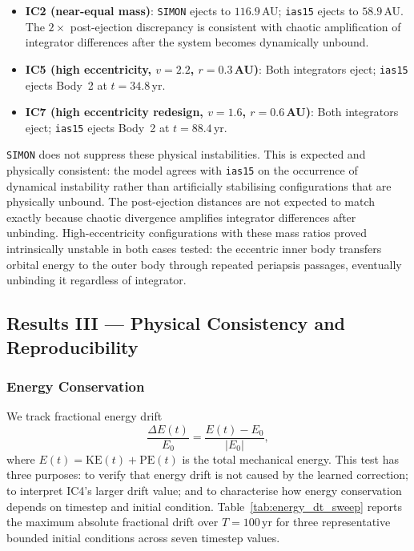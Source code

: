 \documentclass[12pt]{article}
\begin{document}
\begin{itemize}
  \item \textbf{IC2 (near-equal mass)}: \texttt{SIMON} ejects to $116.9$\,AU;
        \texttt{ias15} ejects to $58.9$\,AU. The $2\times$ post-ejection discrepancy
        is consistent with chaotic amplification of integrator differences after the
        system becomes dynamically unbound.
  \item \textbf{IC5 (high eccentricity, $v = 2.2$, $r = 0.3$\,AU)}: Both
        integrators eject; \texttt{ias15} ejects Body~2 at $t = 34.8$\,yr.
  \item \textbf{IC7 (high eccentricity redesign, $v = 1.6$, $r = 0.6$\,AU)}:
        Both integrators eject; \texttt{ias15} ejects Body~2 at $t = 88.4$\,yr.
\end{itemize}

\texttt{SIMON} does not suppress these physical instabilities. This is expected and physically consistent: the model agrees with \texttt{ias15} on the occurrence of dynamical instability rather than artificially stabilising configurations that
are physically unbound. The post-ejection distances are not expected to match exactly
because chaotic divergence amplifies integrator differences after unbinding. High-eccentricity
configurations with these mass ratios proved intrinsically unstable in both cases
tested: the eccentric inner body transfers orbital energy to the outer body through
repeated periapsis passages, eventually unbinding it regardless of integrator.


\subsection{Results III --- Physical Consistency and Reproducibility}
\label{sec:physical}

\subsubsection{Energy Conservation}
\label{sec:energy}

We track fractional energy drift
\[
    \frac{\Delta E(t)}{E_0}
    = \frac{E(t) - E_0}{\lvert E_0 \rvert},
\]
where $E(t) = \mathrm{KE}(t)+\mathrm{PE}(t)$ is the total mechanical
energy. This test has three purposes: to verify that energy drift is
not caused by the learned correction; to interpret IC4's larger drift
value; and to characterise how energy conservation depends on timestep
and initial condition.
Table~\ref{tab:energy_dt_sweep} reports the maximum absolute
fractional drift over $T=100$\,yr for three representative bounded
initial conditions across seven timestep values.
\end{document}
